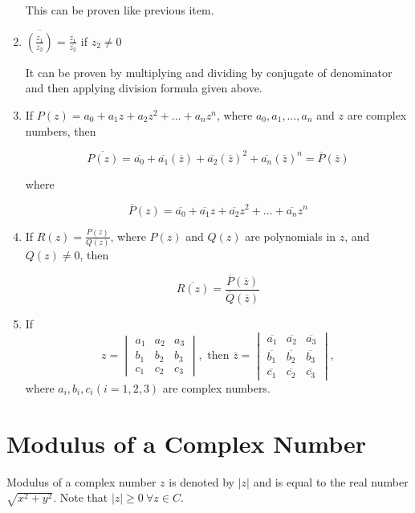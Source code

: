 \begin{enumerate}
  This can be proven like previous item.
\item $\overline{\left(\frac{z_1}{z_2}\right)} = \frac{\overline{z_1}}{\overline{z_2}}$ if $z_2\neq 0$

  It can be proven by multiplying and dividing by conjugate of denominator and then applying division formula given above.
\item If $P(z) = a_0 + a_1z + a_2z^2 + \ldots + a_nz^n$, where $a_0, a_1, \ldots, a_n$ and $z$ are complex numbers, then

  $$\overline{P(z)} = \overline{a_0} + \overline{a_1}(\overline{z}) + \overline{a_2}(\overline{z})^2 +
  \overline{a_n}(\overline{z})^n = \overline{P}(\overline{z})$$

  where

  $$\overline{P}(z) = \overline{a_0} + \overline{a_1}z + \overline{a_2}z^2 + \ldots + \overline{a_n}z^n$$
\item If $R(z) = \frac{P(z)}{Q(z)}$, where $P(z)$ and $Q(z)$ are polynomials in $z$, and$Q(z) \neq 0$, then

  $$\overline{R(z)} = \frac{\overline{P}(\overline{z})}{\overline{Q}(\overline{z})}$$
\item If $$z = \begin{vmatrix}a_1 & a_2 & a_3\\ b_1 & b_2 & b_3 \\ c_1 & c_2 & c_3\end{vmatrix}, \text{~then~}\overline{z}
  = \begin{vmatrix}\overline{a_1} & \overline{a_2} & \overline{a_3}\\ \overline{b_1} & \overline{b_2} & \overline{b_3}
    \\ \overline{c_1} & \overline{c_2} & \overline{c_3}\end{vmatrix},$$
  where $a_i, b_i, c_i(i = 1,2,3)$ are complex numbers.
\end{enumerate}

\section{Modulus of a Complex Number}
Modulus of a complex number $z$ is denoted by $|z|$ and is equal to the real number $\sqrt{x^2 + y^2}$. Note that $|z| \geq
0~\forall z \in C$.
